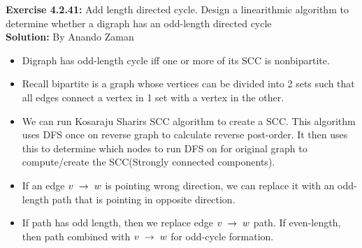 \documentclass[11pt,fleqn]{article}
\begin{document}
\textbf{Exercise 4.2.41:} Add length directed cycle. Design a linearithmic algorithm to determine whether a digraph has an odd-length directed cycle\\

\textbf{Solution:}
By Anando Zaman


\begin{itemize}
	\item Digraph has odd-length cycle iff one or more of its SCC is nonbipartite.
	
	\item Recall bipartite is a graph whose vertices can be divided into 2 sets such that all edges connect a vertex in 1 set with a vertex in the other.
	
	\item We can run Kosaraju Sharirs SCC algorithm to create a SCC. This algorithm uses DFS once on reverse graph to calculate reverse post-order. It then uses this to determine which nodes to run DFS on for original graph to compute/create the SCC(Strongly connected components).
	
	\item If an edge $v \thickspace \rightarrow \thickspace w$ is pointing wrong direction, we can replace it with an odd-length path that is pointing in opposite direction.
	
	\item If path has odd length, then we replace edge $v \thickspace \rightarrow \thickspace w$ path. If even-length, then path combined with $v \thickspace \rightarrow \thickspace w$ for odd-cycle formation.
\end{itemize}
\end{document}
